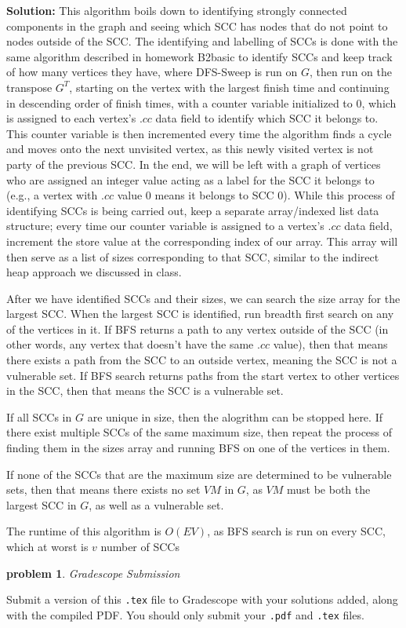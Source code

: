 \documentclass[10pt]{article}
\newcommand{\solution}[1]{\color{blue}\hfill\break\noindent\textbf{Solution:} #1\color{black}}
\newtheorem{problem}{\sc\color{cit}problem}
\begin{document}
\solution{
This algorithm boils down to identifying strongly connected components in the graph and seeing which SCC has nodes that do not point to nodes outside of the SCC. The identifying and labelling of SCCs is done with the same algorithm described in homework B2basic to identify SCCs and keep track of how many vertices they have, where DFS-Sweep is run on $G$, then run on the transpose $G^T$, starting on the vertex with the largest finish time and continuing in descending order of finish times, with a counter variable initialized to 0, which is assigned to each vertex's $.cc$ data field to identify which SCC it belongs to. This counter variable is then incremented every time the algorithm finds a cycle and moves onto the next unvisited vertex, as this newly visited vertex is not party of the previous SCC. In the end, we will be left with a graph of vertices who are assigned an integer value acting as a label for the SCC it belongs to (e.g., a vertex with $.cc$ value 0 means it belongs to SCC 0). While this process of identifying SCCs is being carried out, keep a separate array/indexed list data structure; every time our counter variable is assigned to a vertex's $.cc$ data field, increment the store value at the corresponding index of our array. This array will then serve as a list of sizes corresponding to that SCC, similar to the indirect heap approach we discussed in class.

After we have identified SCCs and their sizes, we can search the size array for the largest SCC. When the largest SCC is identified, run breadth first search on any of the vertices in it. If BFS returns a path to any vertex outside of the SCC (in other words, any vertex that doesn't have the same $.cc$ value), then that means there exists a path from the SCC to an outside vertex, meaning the SCC is not a vulnerable set. If BFS search returns paths from the start vertex to other vertices in the SCC, then that means the SCC is a vulnerable set.

If all SCCs in $G$ are unique in size, then the alogrithm can be stopped here. If there exist multiple SCCs of the same maximum size, then repeat the process of finding them in the sizes array and running BFS on one of the vertices in them.

If none of the SCCs that are the maximum size are determined to be vulnerable sets, then that means there exists no set $VM$ in $G$, as $VM$ must be both the largest SCC in $G$, as well as a vulnerable set.

The runtime of this algorithm is $O(EV)$, as BFS search is run on every SCC, which at worst is $v$ number of SCCs
}


\begin{problem} Gradescope Submission \end{problem}
Submit a version of this \verb|.tex| file to Gradescope with your solutions added, along with the compiled PDF.  You should only submit your \verb|.pdf| and \verb|.tex| files.
\end{document}
